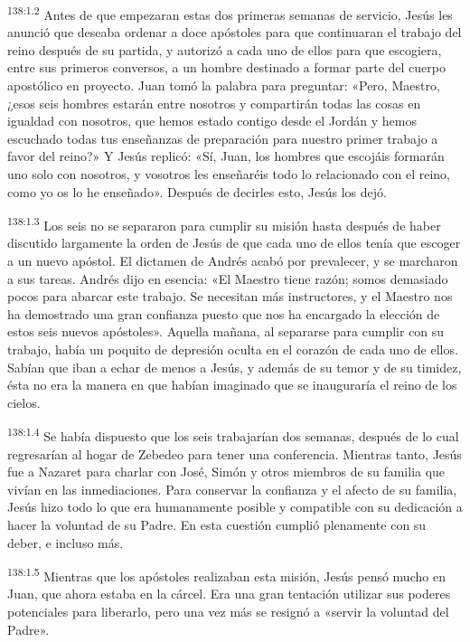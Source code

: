 \par
\textsuperscript{138:1.2} Antes de que empezaran estas dos primeras semanas de servicio, Jesús les anunció que deseaba ordenar a doce apóstoles para que continuaran el trabajo del reino después de su partida, y autorizó a cada uno de ellos para que escogiera, entre sus primeros conversos, a un hombre destinado a formar parte del cuerpo apostólico en proyecto. Juan tomó la palabra para preguntar: «Pero, Maestro, ¿esos seis hombres estarán entre nosotros y compartirán todas las cosas en igualdad con nosotros, que hemos estado contigo desde el Jordán y hemos escuchado todas tus enseñanzas de preparación para nuestro primer trabajo a favor del reino?» Y Jesús replicó: «Sí, Juan, los hombres que escojáis formarán uno solo con nosotros, y vosotros les enseñaréis todo lo relacionado con el reino, como yo os lo he enseñado». Después de decirles esto, Jesús los dejó.

\par
\textsuperscript{138:1.3} Los seis no se separaron para cumplir su misión hasta después de haber discutido largamente la orden de Jesús de que cada uno de ellos tenía que escoger a un nuevo apóstol. El dictamen de Andrés acabó por prevalecer, y se marcharon a sus tareas. Andrés dijo en esencia: «El Maestro tiene razón; somos demasiado pocos para abarcar este trabajo. Se necesitan más instructores, y el Maestro nos ha demostrado una gran confianza puesto que nos ha encargado la elección de estos seis nuevos apóstoles». Aquella mañana, al separarse para cumplir con su trabajo, había un poquito de depresión oculta en el corazón de cada uno de ellos. Sabían que iban a echar de menos a Jesús, y además de su temor y de su timidez, ésta no era la manera en que habían imaginado que se inauguraría el reino de los cielos.

\par
\textsuperscript{138:1.4} Se había dispuesto que los seis trabajarían dos semanas, después de lo cual regresarían al hogar de Zebedeo para tener una conferencia. Mientras tanto, Jesús fue a Nazaret para charlar con José, Simón y otros miembros de su familia que vivían en las inmediaciones. Para conservar la confianza y el afecto de su familia, Jesús hizo todo lo que era humanamente posible y compatible con su dedicación a hacer la voluntad de su Padre. En esta cuestión cumplió plenamente con su deber, e incluso más.

\par
\textsuperscript{138:1.5} Mientras que los apóstoles realizaban esta misión, Jesús pensó mucho en Juan, que ahora estaba en la cárcel. Era una gran tentación utilizar sus poderes potenciales para liberarlo, pero una vez más se resignó a «servir la voluntad del Padre».

